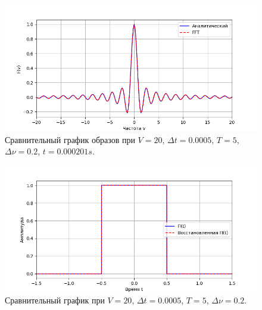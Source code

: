 \documentclass[a4paper]{article}
\begin{document}
\begin{figure}[H]
  \centering
  \includegraphics[width=\textwidth]{src/task_1_4/freq_5_0.0005_20_0.2.png}
  \caption{Сравнительный график образов при $V=20$, $\Delta t=0.0005$, $T=5$, $\Delta \nu=0.2$, $t=0.000201 s$.} 
\end{figure}
\begin{figure}[H]
  \centering
  \includegraphics[width=\textwidth]{src/task_1_4/time_5_0.0005_20_0.2.png}
  \caption{Сравнительный график при $V=20$, $\Delta t=0.0005$, $T=5$, $\Delta \nu=0.2$.} 
\end{figure}
\end{document}
